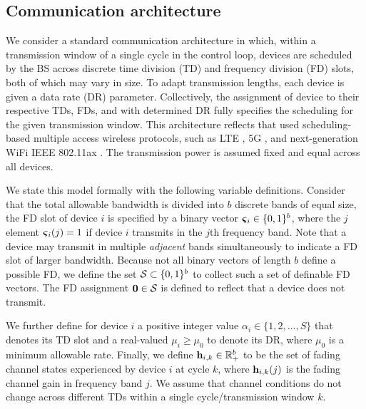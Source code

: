 \subsection{Communication architecture}\label{sec_comm_model}

We consider a standard communication architecture in which, within a transmission window of a single cycle in the control loop, devices are scheduled by the BS across discrete time division (TD) and frequency division (FD) slots, both of which may vary in size. To adapt transmission lengths, each device is given a data rate (DR) parameter. Collectively, the assignment of device to their respective TDs, FDs, and with determined DR fully specifies the scheduling for the given transmission window. This architecture reflects that used scheduling-based multiple access wireless protocols, such as LTE \cite{sesia2011lte} , 5G \cite{agiwal2016next}, and next-generation WiFi IEEE 802.11ax \cite{liu2014ieee}. The transmission power is assumed fixed and equal across all devices.

We state this model formally with the following variable definitions. Consider that the total allowable bandwidth is divided into $b$ discrete bands of equal size,  the FD slot of device $i$ is specified by a binary vector $\boldsymbol{\varsigma}_{i} \in \{0,1\}^b$, where the $j$ element $\boldsymbol{\varsigma}_i(j) = 1$ if device $i$ transmits in the $j$th frequency band. Note that a device may transmit in multiple \emph{adjacent} bands simultaneously to indicate a FD slot of larger bandwidth. Because not all binary vectors of length $b$ define a possible FD, we define the set ${\mathcal S} \subset \{0,1\}^{b}$ to collect such a set of definable FD vectors.  The FD assignment $\bb0 \in \ccalS$ is defined to reflect that a device does not transmit.

We further define for device $i$ a positive integer value $\alpha_i \in \{1,2,\hdots,S\}$ that denotes its TD slot and a real-valued $\mu_i \geq \mu_0$ to denote its DR, where $\mu_0$ is a minimum allowable rate. Finally, we define ${\mathbf h}_{i,k} \in {\mathbb R}^b_+$ to be the set of fading channel states experienced by device $i$ at cycle $k$, where ${\mathbf h}_{i,k}(j)$ is the fading channel gain in frequency band $j$. We assume that channel conditions do not change across different TDs within a single cycle/transmission window $k$.

